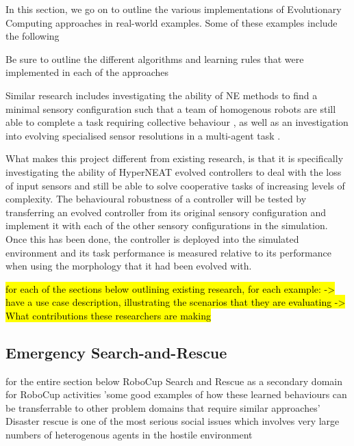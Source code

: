 In this section, we go on to outline the various implementations of Evolutionary Computing approaches in real-world examples. Some of these examples include the following

Be sure to outline the different algorithms and learning rules that were implemented in each of the approaches


Similar research includes investigating the ability of NE methods to find a minimal sensory configuration such that a team of homogenous robots are still able to complete a task requiring collective behaviour \cite{WatsonNitschke2015CEC}, as well as an investigation into evolving specialised sensor resolutions in a multi-agent task \cite{NitschkeSchutEiben2010}.


What makes this project different from existing research, is that it is specifically investigating the ability of HyperNEAT evolved controllers to deal with the loss of input sensors and still be able to solve cooperative tasks of increasing levels of complexity.
The behavioural robustness of a controller will be tested by transferring an evolved controller from its original sensory configuration and implement it with each of the other sensory configurations in the simulation. Once this has been done, the controller is deployed into the simulated environment and its task performance is measured relative to its performance when using the morphology that it had been evolved with.

\hl{for each of the sections below outlining existing research, for each example:
-> have a use case description, illustrating the scenarios that they are evaluating
-> What contributions these researchers are making}


\subsection{Emergency Search-and-Rescue}

\cite{KitanoTadokoro1999} for the entire section below
RoboCup Search and Rescue as a secondary domain for RoboCup activities
'some good examples of how these learned behaviours can be transferrable to other problem domains that require similar approaches'
Disaster rescue is one of the most serious social issues which involves very large numbers of heterogenous agents in the hostile environment

